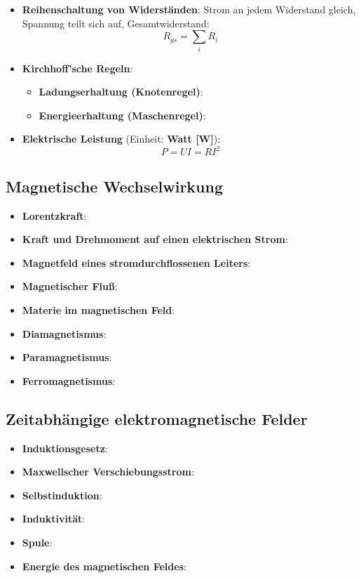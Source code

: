 \begin{itemize}
\begin{equation}
	\end{equation}
	\item \textbf{Reihenschaltung von Widerständen}: Strom an jedem Widerstand gleich, Spannung teilt sich auf, Gesamtwiderstand:
	\begin{equation}
		R_{gs} = \sum_i R_i
	\end{equation}
	\item \textbf{Kirchhoff'sche Regeln}:
	\begin{itemize}
		\item \textbf{Ladungserhaltung (Knotenregel)}: 
		\item \textbf{Energieerhaltung (Maschenregel)}: 
	\end{itemize}
	\item \textbf{Elektrische Leistung} (Einheit: \textbf{Watt [W]}):
	\begin{equation}
		P = U I = R I^2
	\end{equation}
\end{itemize}

\newpage
\subsection{Magnetische Wechselwirkung}%
\label{edyn:sub:magnetische_wechselwirkung}

\begin{itemize}
	\item \textbf{Lorentzkraft}:
	\item \textbf{Kraft und Drehmoment auf einen elektrischen Strom}:
	\item \textbf{Magnetfeld eines stromdurchflossenen Leiters}:
	\item \textbf{Magnetischer Fluß}:
	\item \textbf{Materie im magnetischen Feld}:
	\item \textbf{Diamagnetismus}:
	\item \textbf{Paramagnetismus}:
	\item \textbf{Ferromagnetismus}:
\end{itemize}

\subsection{Zeitabhängige elektromagnetische Felder}%
\label{edyn:sub:zeitabhaengige_elektromagnetische_felder}

\begin{itemize}
	\item \textbf{Induktionsgesetz}:
	\item \textbf{Maxwellscher Verschiebungsstrom}:
	\item \textbf{Selbstinduktion}:
	\item \textbf{Induktivität}:
	\item \textbf{Spule}:
	\item \textbf{Energie des magnetischen Feldes}:
\end{itemize}